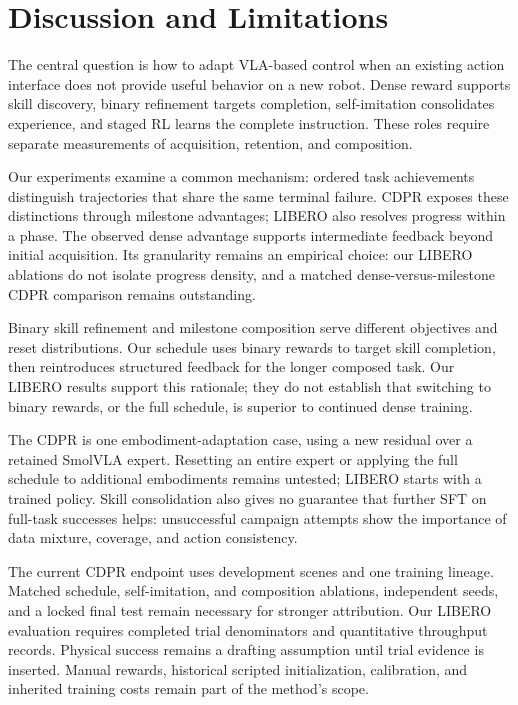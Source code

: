 \section{Discussion and Limitations}\label{sec:discussion}
The central question is how to adapt VLA-based control when an existing action interface does not provide useful behavior on a new robot. Dense reward supports skill discovery, binary refinement targets completion, self-imitation consolidates experience, and staged RL learns the complete instruction. These roles require separate measurements of acquisition, retention, and composition.

Our experiments examine a common mechanism: ordered task achievements distinguish trajectories that share the same terminal failure. CDPR exposes these distinctions through milestone advantages; LIBERO also resolves progress within a phase. The observed dense advantage supports intermediate feedback beyond initial acquisition. Its granularity remains an empirical choice: our LIBERO ablations do not isolate progress density, and a matched dense-versus-milestone CDPR comparison remains outstanding.

Binary skill refinement and milestone composition serve different objectives and reset distributions. Our schedule uses binary rewards to target skill completion, then reintroduces structured feedback for the longer composed task. Our LIBERO results support this rationale; they do not establish that switching to binary rewards, or the full schedule, is superior to continued dense training.

The CDPR is one embodiment-adaptation case, using a new residual over a retained SmolVLA expert. Resetting an entire expert or applying the full schedule to additional embodiments remains untested; LIBERO starts with a trained policy. Skill consolidation also gives no guarantee that further SFT on full-task successes helps: unsuccessful campaign attempts show the importance of data mixture, coverage, and action consistency.

The current CDPR endpoint uses development scenes and one training lineage. Matched schedule, self-imitation, and composition ablations, independent seeds, and a locked final test remain necessary for stronger attribution. Our LIBERO evaluation requires completed trial denominators and quantitative throughput records. Physical success remains a drafting assumption until trial evidence is inserted. Manual rewards, historical scripted initialization, calibration, and inherited training costs remain part of the method's scope.
